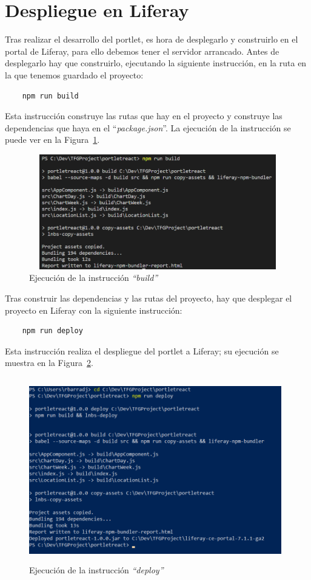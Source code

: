 \documentclass[a4paper, 12pt]{book}
\begin{document}
\section{Despliegue en Liferay} 
\label{sec:despliegue-liferay}
Tras realizar el desarrollo del portlet, es hora de desplegarlo y construirlo en el portal de Liferay, para ello debemos tener el servidor arrancado. Antes de desplegarlo hay que construirlo, ejecutando la siguiente instrucción, en la ruta en la que tenemos guardado el proyecto:
\begin{verbatim}
    npm run build
\end{verbatim} 
Esta instrucción construye las rutas que hay en el proyecto y construye las dependencias que haya en el ``\textit{package.json}''. La ejecución de la instrucción se puede ver en la Figura~\ref{fig:npm_build}.
\begin{figure}[h]
  \centering
  \includegraphics[width=12cm, height=5cm]{img_usadas/npm_build.png}
  \caption{Ejecución de la instrucción \textit{``build''}}
  \label{fig:npm_build}
\end{figure}

Tras construir las dependencias y las rutas del proyecto, hay que desplegar el proyecto en Liferay con la siguiente instrucción: 
\begin{verbatim}
    npm run deploy
\end{verbatim}
Esta instrucción realiza el despliegue del portlet a Liferay; su ejecución se muestra en la Figura~\ref{fig:deploy}.
\begin{figure}[h]
  \centering
  \includegraphics[width=11cm, height=8cm]{img_usadas/deploy.png}
  \caption{Ejecución de la instrucción \textit{``deploy''}}
  \label{fig:deploy}
\end{figure}
\end{document}
